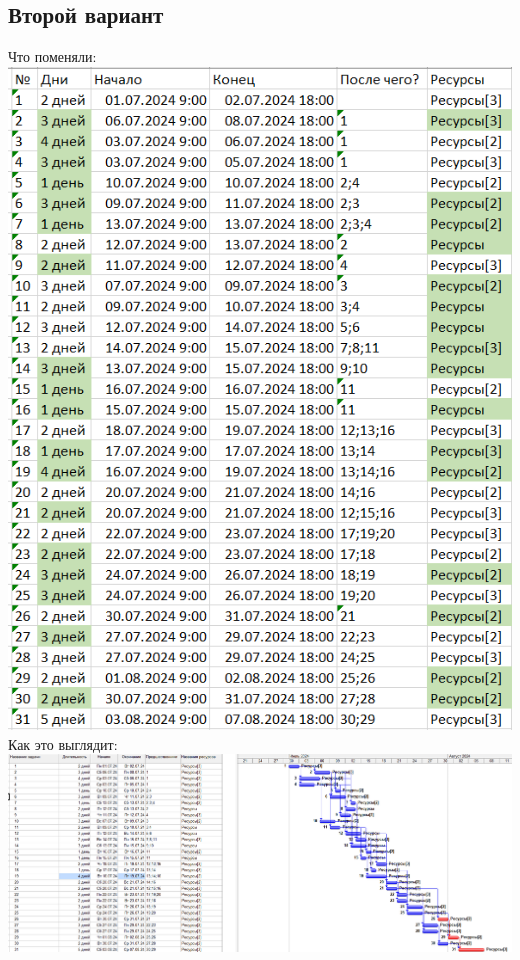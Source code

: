 \documentclass[14pt]{article}
\begin{document}
	\subsection{Второй вариант}
		{\LARGE Что поменяли:}\\
		\includegraphics[height=0.6\textheight]{../img/1b2_days_change.png}\\ 
		{\LARGE Как это выглядит:}\\
		\includegraphics[width=\textwidth]{../img/ot1b1_2.png}\\
\end{document}
